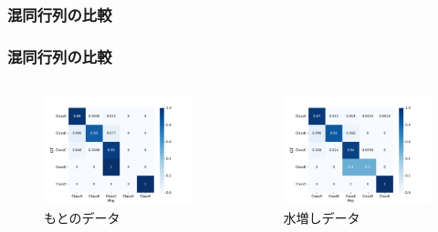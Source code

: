 \documentclass[leno,xcolor=dvipsnames]{beamer}
\begin{document}
  \begin{frame}
    \frametitle{混同行列の比較}
    \frametitle{混同行列の比較}
    \begin{columns}
      \begin{column}{0.48\textwidth}
        \begin{figure}[H]
          \centering
          \includegraphics[keepaspectratio, scale=0.35]{images/deepimfam_confusion_matrix_ratio.pdf}
          \caption{もとのデータ}
        \end{figure}
      \end{column}
      \begin{column}{0.48\textwidth}
        \begin{figure}[H]
          \centering
          \includegraphics[keepaspectratio, scale=0.35]{images/deepimfam_augmentation_confusion_matrix_ratio.pdf}
          \caption{水増しデータ}
        \end{figure}
      \end{column}
    \end{columns}
  \end{frame}
\end{document}
